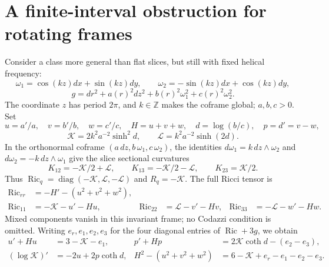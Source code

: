 \documentclass[a4paper,11pt]{article}
\numberwithin{equation}{section}
\theoremstyle{definition}
\newcommand{\Ric}{\operatorname{Ric}}
\newcommand{\Z}{\mathbb Z}
\begin{document}
\section{A finite-interval obstruction for rotating frames}
Consider a class more general than flat slices, but still with fixed helical frequency:
\[
 \omega_1=\cos(kz)dx+\sin(kz)dy,\qquad
 \omega_2=-\sin(kz)dx+\cos(kz)dy,
\]
\[
 g=dr^2+a(r)^2dz^2+b(r)^2\omega_1^2+c(r)^2\omega_2^2.
\]
The coordinate $z$ has period $2\pi$, and $k\in\Z$ makes the coframe global; $a,b,c>0$.
Set
\[
 u=a'/a,\quad v=b'/b,\quad w=c'/c,\quad H=u+v+w,\quad
 d=\log(b/c),\quad p=d'=v-w,
\]
\[
 \mathcal K=2k^2a^{-2}\sinh^2d,\qquad
 \mathcal L=k^2a^{-2}\sinh(2d).
\]
In the orthonormal coframe $(a\,dz,b\,\omega_1,c\,\omega_2)$, the identities
$d\omega_1=k\,dz\wedge\omega_2$ and $d\omega_2=-k\,dz\wedge\omega_1$ give the slice sectional curvatures
\[
 K_{12}=-\mathcal K/2+\mathcal L,\qquad
 K_{13}=-\mathcal K/2-\mathcal L,\qquad K_{23}=\mathcal K/2.
\]
Thus $\Ric_q=\operatorname{diag}(-\mathcal K,\mathcal L,-\mathcal L)$ and $R_q=-\mathcal K$.
The full Ricci tensor is
\begin{align*}
 \Ric_{rr}&=-H'-(u^2+v^2+w^2),\\
 \Ric_{11}&=-\mathcal K-u'-Hu,&
 \Ric_{22}&=\mathcal L-v'-Hv,&
 \Ric_{33}&=-\mathcal L-w'-Hw.
\end{align*}
Mixed components vanish in this invariant frame; no Codazzi condition is omitted.
Writing $e_r,e_1,e_2,e_3$ for the four diagonal entries of $\Ric+3g$, we obtain
\begin{align}
 u'+Hu&=3-\mathcal K-e_1,&
 p'+Hp&=2\mathcal K\coth d-(e_2-e_3),\label{eq:helical-ode}\\
 (\log\mathcal K)'&=-2u+2p\coth d,&
 H^2-(u^2+v^2+w^2)&=6-\mathcal K+e_r-e_1-e_2-e_3.\nonumber
\end{align}
\end{document}
